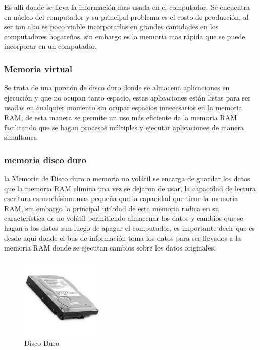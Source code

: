 \documentclass{article}
\begin{document}
        Es allí donde se lleva la información mas usada en el computador. Se encuentra en núcleo del computador y su principal problema es el costo de producción, al ser tan alto es poco viable incorporarlas en grandes cantidades en los computadores hogareños, sin embargo es la memoria mas rápida que se puede incorporar en un computador.   
        
        
        
        
        \subsubsection{Memoria virtual}
        Se trata de una porción de disco duro donde se almacena aplicaciones en ejecución y que no ocupan tanto espacio, estas aplicaciones están listas para ser usadas en cualquier momento sin ocupar espacios innecesarios en la memoria RAM, de esta manera se permite un uso más eficiente de la memoria RAM facilitando que se hagan procesos múltiples y ejecutar aplicaciones de manera simultanea 
        
        \subsubsection{memoria disco duro}
        la Memoria de Disco duro o memoria no volátil se encarga de guardar los datos que la memoria RAM elimina una vez se dejaron de usar, la capacidad de lectura  escritura es muchísima mas pequeña que la capacidad que tiene la memoria RAM, sin embargo la principal utilidad de esta memoria radica en su característica de no volátil permitiendo almacenar los datos y cambios que se hagan a los datos aun luego de apagar el computador, es importante decir que es desde aquí donde el bus de información toma los datos para ser llevados a la memoria RAM donde se ejecutan cambios sobre los datos originales. 
        
        \begin{figure}[h]
        \includegraphics[width=4cm]{discoDuro.jpg}
        \centering
        \caption{Disco Duro}
        \label{fig:discoDuro}
        \end{figure}
        
\end{document}
